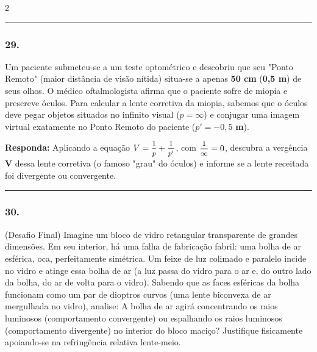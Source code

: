 \documentclass[twoside, 10pt, a4paper]{article}
\newlength{\espacoPreQuestao}\setlength{\espacoPreQuestao}{0.1cm}
\newlength{\espacoQuestao}\setlength{\espacoQuestao}{0.2cm}
\begin{document}
\begin{multicols*}{2}
\noindent\textcolor{CorLinha}{\rule{\linewidth}{0.5pt}} 
\par\vspace{\espacoPreQuestao}
\subsubsection*{29.} Um paciente submeteu-se a um teste optométrico e descobriu que seu "Ponto Remoto" (maior distância de visão nítida) situa-se a apenas \textbf{50 cm} (\textbf{0,5 m}) de seus olhos. O médico oftalmologista afirma que o paciente sofre de miopia e prescreve óculos. 
Para calcular a lente corretiva da miopia, sabemos que o óculos deve pegar objetos situados no infinito visual ($ p = \infty $) e conjugar uma imagem virtual exatamente no Ponto Remoto do paciente ($ p' = -0,5 $ \textbf{m}). 
\begin{boxresponda}
\textbf{Responda:} Aplicando a equação $ V = \mfrac{1}{p} + \mfrac{1}{p'} $, com $ \mfrac{1}{\infty} = 0 $, descubra a vergência \textbf{V} dessa lente corretiva (o famoso "grau" do óculos) e informe se a lente receitada foi divergente ou convergente.
\end{boxresponda}
\par\vspace{\espacoQuestao}

\noindent\textcolor{CorLinha}{\rule{\linewidth}{0.5pt}} 
\par\vspace{\espacoPreQuestao}
\subsubsection*{30.} (Desafio Final) Imagine um bloco de vidro retangular transparente de grandes dimensões. Em seu interior, há uma falha de fabricação fabril: uma bolha de ar esférica, oca, perfeitamente simétrica. Um feixe de luz colimado e paralelo incide no vidro e atinge essa bolha de ar (a luz passa do vidro para o ar e, do outro lado da bolha, do ar de volta para o vidro).
Sabendo que as faces esféricas da bolha funcionam como um par de dioptros curvos (uma lente biconvexa de ar mergulhada no vidro), analise: A bolha de ar agirá concentrando os raios luminosos (comportamento convergente) ou espalhando os raios luminosos (comportamento divergente) no interior do bloco maciço? Justifique fisicamente apoiando-se na refringência relativa lente-meio.
\par\vspace{\espacoQuestao}

\end{multicols*}
\end{document}
